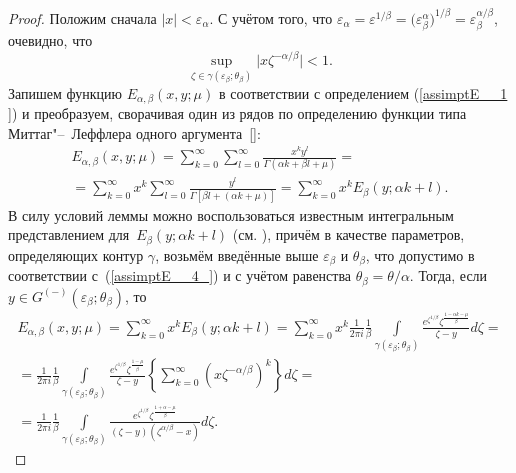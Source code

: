 \begin{proof}
Положим сначала $|x|<\varepsilon _{\alpha } $. С учётом того,
что $\varepsilon _{\alpha } =\varepsilon ^{1/\beta} =\bigl(\varepsilon _{\beta }^{\alpha } \bigr)^{1/\beta} =\varepsilon_\beta^{\alpha/\beta}$, очевидно, что 
\begin{equation*}
\mathop{\sup }\limits_{\zeta \in \gamma (\varepsilon_\beta; \theta_\beta)} \bigl|x\zeta ^{-\alpha/ \beta  } \bigr|<1.
\end{equation*}
Запишем функцию $E_{\alpha, \beta }  (x, y; \mu)$ в соответствии с определением (\ref{assimptE__1 }) и преобразуем, сворачивая один из рядов по определению функции типа Миттаг"--~Леффлера одного аргумента~[]:
\begin{multline*}
E_{\alpha, \beta }  (x, y; \mu)=\sum_{k=0}^{\infty }\sum _{l=0}^{\infty }\frac{x^k  y^l  }{\Gamma (\alpha k+\beta l+\mu )}=
\\
=\sum_{k=0}^{\infty }x^k  \sum _{l=0}^{\infty }\frac{y^l  }{\Gamma \left[\beta l+(\alpha k+\mu )\right]}=\sum _{k=0}^{\infty }x^k  E_{\beta } (y; \alpha k+l)  .
\end{multline*} 
В силу условий леммы можно воспользоваться известным интегральным представлением
для~$E_\beta (y; \alpha k+l) $ (см. \cite[формула (2.2)]{assimptE:bib:Djabrashyan}), причём в качестве параметров, определяющих контур $\gamma$, возьмём
введённые выше $\varepsilon_\beta$ и $\theta_\beta$, что допустимо в соответствии
с~(\ref{assimptE__4_}) и с учётом равенства $\theta_\beta =\theta /\alpha$.
Тогда, если $y\in G^{(-)} (\varepsilon _\beta  ;\theta _\beta )$, то
\begin{multline} 
\label{assimptE__7_}
E_{\alpha, \beta }  (x, y; \mu)=\sum _{k=0}^{\infty }x^k  E_{\beta } (y; \alpha k+l) =
\sum _{k=0}^{\infty }x^k   \frac{1}{2\pi i} \frac{1}{\beta } \int\limits_{\gamma (\varepsilon_\beta; \theta_\beta ) }
\frac{e^{\zeta ^{1/\beta}} \zeta ^{\frac{1-\alpha k-\mu }{\beta } } }{\zeta -y} d \zeta=
\\
=\frac{1}{2\pi i} \frac{1}{\beta } \int\limits_{\gamma (\varepsilon_\beta; \theta_\beta ) }\frac{e^{\zeta ^{1/\beta}} \zeta ^{\frac{1-\mu }{\beta } } }{\zeta -y} \left\{\sum _{k=0}^{\infty }\left(x\zeta^{-\alpha/\beta}  \right)^{k}  \right\}d \zeta=
\\
=\frac{1}{2\pi i} \frac{1}{\beta } \int\limits_{\gamma (\varepsilon_\beta; \theta_\beta ) }\frac{e^{\zeta ^{1/\beta}} \zeta ^{\frac{1+\alpha -\mu }{\beta } } }{\left(\zeta -y\right)\left(\zeta^{\alpha /\beta}  -x\right)} d \zeta.
\end{multline}

\end{proof}
